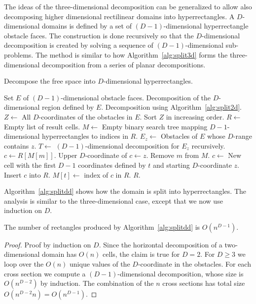 \documentclass[english,gradu]{tktltiki2018}
\begin{document}
The ideas of the three-dimensional decomposition can be generalized to allow also decomposing higher dimensional rectilinear domains into hyperrectangles.
A $D$-dimensional domains is defined by a set of $(D-1)$-dimensional hyperrectangle obstacle faces.
The construction is done recursively so that the $D$-dimensional decomposition is created by solving a sequence of $(D-1)$-dimensional sub-problems.
The method is similar to how Algorithm~\ref{alg:split3d} forms the three-dimensional decomposition from a series of planar decompositions.

\begin{algorithm}
\caption{Decompose the free space into $D$-dimensional hyperrectangles.}
\label{alg:splitdd}
\begin{algorithmic}
\Require Set $E$ of $(D-1)$-dimensional obstacle faces.
\Output Decomposition of the $D$-dimensional region defined by $E$.
	\State \Return Decomposition using Algorithm~\ref{alg:split2d}.
\EndIf
\State $Z\gets$ All $D$-coordinates of the obstacles in $E$.
\State Sort $Z$ in increasing order.
\State $R\gets$ Empty list of result cells.
\State $M\gets$ Empty binary search tree mapping $D-1$-dimensional hyperrectangles to indices in $R$.
	\State $E_z\gets$ Obstacles of $E$ whose $D$-range contains $z$.
	\State $T\gets$ $(D-1)$-dimensional decomposition for $E_z$ recursively.
		\State $c\gets R[M[m]]$.
		\State Upper $D$-coordinate of $c\gets z$.
		\State Remove $m$ from $M$.
	\EndFor
		\State $c\gets$ New cell with the first $D-1$ coordinates defined by $t$ and starting $D$-coordinate $z$.
		\State Insert $c$ into $R$.
		\State $M[t]\gets$ index of $c$ in $R$.
	\EndFor
\EndFor
\State \Return $R$.
\end{algorithmic}
\end{algorithm}

Algorithm~\ref{alg:splitdd} shows how the domain is split into hyperrectangles.
The analysis is similar to the three-dimensional case, except that we now use induction on $D$.

\begin{lem}\label{lem:splitddcells}The number of rectangles produced by Algorithm~\ref{alg:splitdd} is $O(n^{D-1})$.\end{lem}
\begin{proof}
Proof by induction on $D$.
Since the horizontal decomposition of a two-dimensional domain has $O(n)$ cells, the claim is true for $D=2$.
For $D\ge 3$ we loop over the $O(n)$ unique values of the $D$-coordinate in the obstacles.
For each cross section we compute a $(D-1)$-dimensional decomposition, whose size is $O(n^{D-2})$ by induction.
The combination of the $n$ cross sections has total size $O(n^{D-2}n)=O(n^{D-1})$.
\end{proof}
\end{document}
